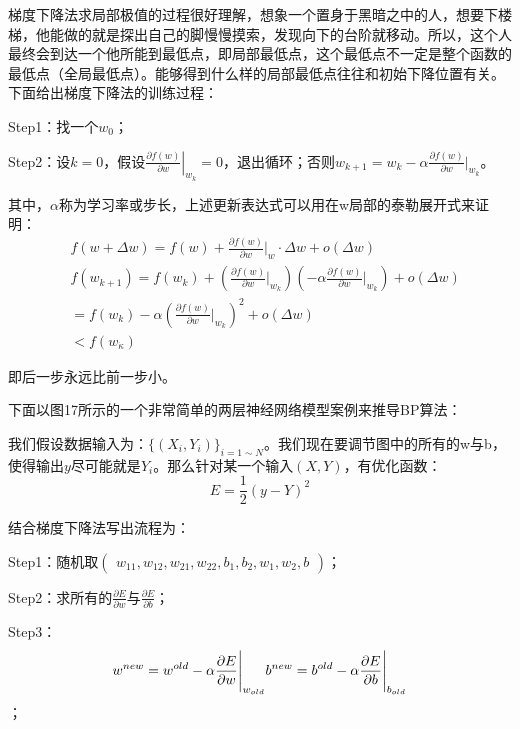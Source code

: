 梯度下降法求局部极值的过程很好理解，想象一个置身于黑暗之中的人，想要下楼梯，他能做的就是探出自己的脚慢慢摸索，发现向下的台阶就移动。所以，这个人最终会到达一个他所能到最低点，即局部最低点，这个最低点不一定是整个函数的最低点（全局最低点）。能够得到什么样的局部最低点往往和初始下降位置有关。下面给出梯度下降法的训练过程：

Step1：找一个$w_0$；

Step2：设$k=0$，假设$\left.\frac{\partial f(w)}{\partial w}\right|_{w_k}=0$，退出循环；否则$w_{k+1}=w_{k}-\alpha\frac{\partial f(w)}{\partial w}\Bigg|_{w_{k}}$。

其中，$\alpha$称为学习率或步长，上述更新表达式可以用在w局部的泰勒展开式来证明：
\begin{equation}\begin{aligned}
		&f(w+\Delta w)=f(w)+\frac{\partial f(w)}{\partial w}\Bigg|_w\cdot\Delta w+o(\Delta w) \\
		&f(w_{k+1})=f(w_{k})+(\frac{\partial f(w)}{\partial w}\Bigg|_{w_{k}})(-\alpha\frac{\partial f(w)}{\partial w}\Bigg|_{w_{k}})+o(\Delta w) \\
		&=f(w_k)-\alpha(\frac{\partial f(w)}{\partial w}\Bigg|_{w_k})^2+o(\Delta w) \\
		&<f(w_{\dot{\kappa}})
\end{aligned}\end{equation}

即后一步永远比前一步小。

下面以图17所示的一个非常简单的两层神经网络模型案例来推导BP算法：

我们假设数据输入为：$\{(X_i,Y_i)\}_{i=1\sim N}$。我们现在要调节图中的所有的w与b，使得输出$y$尽可能就是$Y_{i}$。那么针对某一个输入$(X,Y)$，有优化函数：
\begin{equation}E=\frac12(y-Y)^2\end{equation}

结合梯度下降法写出流程为：

Step1：随机取$(\begin{array}{c}w_{11},w_{12},w_{21},w_{22},b_1,b_2,w_1,w_2,b\end{array})$；

Step2：求所有的$\frac{\partial E}{\partial w}\text{与}\frac{\partial E}{\partial b}$；

Step3：\begin{equation}w^{new}=w^{old}-\alpha\frac{\partial E}{\partial w}\Bigg|_{w_{old}}\\b^{new}=b^{old}-\alpha\frac{\partial E}{\partial b}\Bigg|_{b_{old}}\end{equation}；

